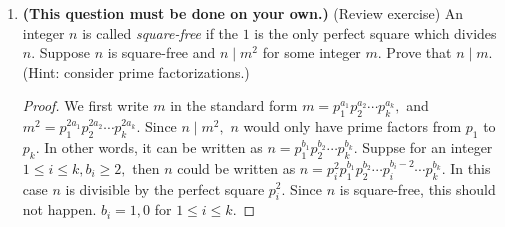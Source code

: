 \documentclass[11pt,a4paper]{article}
\begin{document}
\begin{enumerate}
\begin{enumerate}
		\begin{proof}
			Since \(1 \le r \le p-1\), by definition \( \binom{p}{r} = \frac{p!}{(p-r)!r!} = p \cdot \frac{(p-1)!}{(p-r)!r!} = p \cdot \frac{(p-1)(p-2)\cdots (p-r+1)}{r!}.\) In the previous homework, we have proven that $n!$ always divides the product of $n$ consecutive integers, we know that $\frac{(p-1)(p-2)\cdots (p-r+1)}{r!}$ is an integer. Replace $\frac{(p-1)(p-2)\cdots (p-r+1)}{r!}$ with $i$. Since there exists integer $i$ so that $pi= \binom{p}{r}, p \mid \binom{p}{r}.$ By definition 2.1.1, \( \binom{p}{r} \equiv 0 \mod p \) for each \(r\) with \(1 \le r \le p-1\).
		\end{proof}

		\item Use (a) to prove that \((a+b)^{p} \equiv a^{p}+b^{p} \mod p\). (Who says mathematicians don't have a sense of humor? This result is often referred to as ``The Freshman's Dream''.)

		\begin{proof}
			By binomial theorem, \[(a+b)^{p} = \sum_{k=0}^{p} \binom{p}{k} a^{k} b^{p-k} = a^p + b^p + \sum_{k=1}^{p-1} \binom{p}{k} a^{k} b^{p-k},\]
			\[(a+b)^{p} - (a^p + b^p) = \sum_{k=1}^{p-1} \binom{p}{k} a^{k} b^{p-k}.\]
			From (a) we know that \( \binom{p}{k} \equiv 0 \mod p \) for each \(k\) with \(1 \le k \le p-1.\) Thus $p \mid \binom{p}{k}$ for \(1 \le k \le p-1.\) By property 2 of "Divides", $p \mid \sum_{k=1}^{p-1} \binom{p}{k} a^{k} b^{p-k}.$ Thus $p \mid (a+b)^{p} - (a^p + b^p).$ By definition 2.1.1, \((a+b)^{p} \equiv a^{p}+b^{p} \mod p.\)
		\end{proof}
	\end{enumerate}

	\item \textbf{(This question must be done on your own.)} (Review exercise) An integer \(n\) is called \textit{square-free} if the \(1\) is the only perfect square which divides \(n\). Suppose \(n\) is square-free and \(n \mid m^2\) for some integer \(m\). Prove that \(n \mid m\). (Hint: consider prime factorizations.)

	\begin{proof}
		We first write $m$ in the standard form \(m = p_{1}^{a_{1}} p_{2}^{a_{2}}\cdots p_{k}^{a_{k}},\) and $m^2 = p_{1}^{2a_{1}} p_{2}^{2a_{2}}\cdots p_{k}^{2a_{k}}.$ Since $n \mid m^2,$ $n$ would only have prime factors from $p_1$ to $p_k.$ In other words, it can be written as \(n = p_{1}^{b_{1}} p_{2}^{b_{2}}\cdots p_{k}^{b_{k}}.\) Suppse for an integer $ 1 \leq i \leq k, b_i \geq 2,$ then $n$ could be written as \(n = p_i^2 p_{1}^{b_{1}} p_{2}^{b_{2}}\cdots p_i^{b_i-2} \cdots p_{k}^{b_{k}}.\) In this case $n$ is divisible by the perfect square $p_i^2.$ Since $n$ is square-free, this should not happen. $b_i = 1, 0$ for $1 \leq i \leq k.$


\end{proof}
\end{enumerate}
\end{document}
